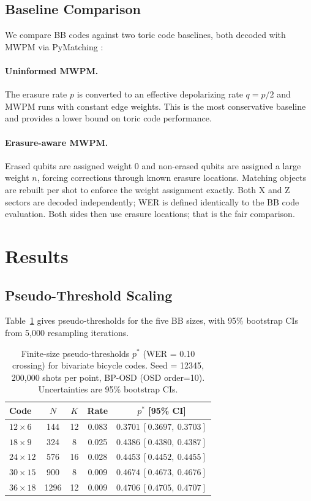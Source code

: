 \documentclass[a4paper]{quantumarticle}
\begin{document}
\subsection{Baseline Comparison}

We compare BB codes against two toric code baselines, both decoded with MWPM
via PyMatching \cite{pymatching}:

\paragraph{Uninformed MWPM.}
The erasure rate $p$ is converted to an effective depolarizing rate $q = p/2$ and MWPM runs
with constant edge weights.
This is the most conservative baseline and provides a lower bound on toric code performance.

\paragraph{Erasure-aware MWPM.}
Erased qubits are assigned weight 0 and non-erased qubits are assigned a large weight $n$,
forcing corrections through known erasure locations.
Matching objects are rebuilt per shot to enforce the weight assignment exactly.
Both X and Z sectors are decoded independently; WER is defined identically to the BB code
evaluation.
Both sides then use erasure locations; that is the fair comparison.

\section{Results}

\subsection{Pseudo-Threshold Scaling}

Table~\ref{tab:thresholds} gives pseudo-thresholds for the five BB sizes, with 95\%
bootstrap CIs from 5{,}000 resampling iterations.

\begin{table}[h]
\centering
\caption{Finite-size pseudo-thresholds $p^*$ (WER = 0.10 crossing) for bivariate bicycle codes.
Seed = 12345, 200{,}000 shots per point, BP-OSD (OSD order=10).
Uncertainties are 95\% bootstrap CIs.}
\label{tab:thresholds}
\setlength{\tabcolsep}{4pt}
\small
\begin{tabular}{lcccc}
\toprule
Code & $N$ & $K$ & Rate & $p^*$ [95\% CI] \\
\midrule
$12{\times}6$  & 144  & 12 & 0.083 & $0.3701\ [0.3697,\ 0.3703]$ \\
$18{\times}9$  & 324  &  8 & 0.025 & $0.4386\ [0.4380,\ 0.4387]$ \\
$24{\times}12$ & 576  & 16 & 0.028 & $0.4453\ [0.4452,\ 0.4455]$ \\
$30{\times}15$ & 900  &  8 & 0.009 & $0.4674\ [0.4673,\ 0.4676]$ \\
$36{\times}18$ & 1296 & 12 & 0.009 & $0.4706\ [0.4705,\ 0.4707]$ \\
\bottomrule
\end{tabular}
\end{table}
\end{document}
